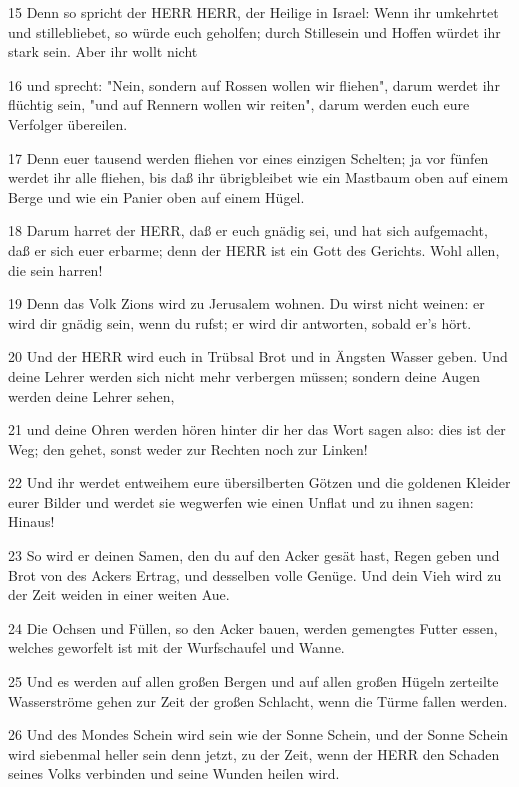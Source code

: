 \par 15 Denn so spricht der HERR HERR, der Heilige in Israel: Wenn ihr umkehrtet und stillebliebet, so würde euch geholfen; durch Stillesein und Hoffen würdet ihr stark sein. Aber ihr wollt nicht
\par 16 und sprecht: "Nein, sondern auf Rossen wollen wir fliehen", darum werdet ihr flüchtig sein, "und auf Rennern wollen wir reiten", darum werden euch eure Verfolger übereilen.
\par 17 Denn euer tausend werden fliehen vor eines einzigen Schelten; ja vor fünfen werdet ihr alle fliehen, bis daß ihr übrigbleibet wie ein Mastbaum oben auf einem Berge und wie ein Panier oben auf einem Hügel.
\par 18 Darum harret der HERR, daß er euch gnädig sei, und hat sich aufgemacht, daß er sich euer erbarme; denn der HERR ist ein Gott des Gerichts. Wohl allen, die sein harren!
\par 19 Denn das Volk Zions wird zu Jerusalem wohnen. Du wirst nicht weinen: er wird dir gnädig sein, wenn du rufst; er wird dir antworten, sobald er's hört.
\par 20 Und der HERR wird euch in Trübsal Brot und in Ängsten Wasser geben. Und deine Lehrer werden sich nicht mehr verbergen müssen; sondern deine Augen werden deine Lehrer sehen,
\par 21 und deine Ohren werden hören hinter dir her das Wort sagen also: dies ist der Weg; den gehet, sonst weder zur Rechten noch zur Linken!
\par 22 Und ihr werdet entweihem eure übersilberten Götzen und die goldenen Kleider eurer Bilder und werdet sie wegwerfen wie einen Unflat und zu ihnen sagen: Hinaus!
\par 23 So wird er deinen Samen, den du auf den Acker gesät hast, Regen geben und Brot von des Ackers Ertrag, und desselben volle Genüge. Und dein Vieh wird zu der Zeit weiden in einer weiten Aue.
\par 24 Die Ochsen und Füllen, so den Acker bauen, werden gemengtes Futter essen, welches geworfelt ist mit der Wurfschaufel und Wanne.
\par 25 Und es werden auf allen großen Bergen und auf allen großen Hügeln zerteilte Wasserströme gehen zur Zeit der großen Schlacht, wenn die Türme fallen werden.
\par 26 Und des Mondes Schein wird sein wie der Sonne Schein, und der Sonne Schein wird siebenmal heller sein denn jetzt, zu der Zeit, wenn der HERR den Schaden seines Volks verbinden und seine Wunden heilen wird.
